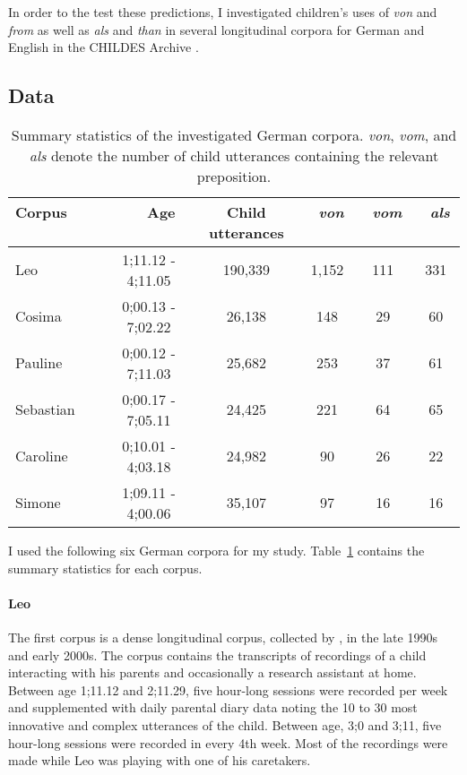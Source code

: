 \documentclass[lucida]{sp} %
\begin{document}
In order to the test these predictions, I investigated children's uses of \textit{von} and \textit{from} as well as \textit{als} and \textit{than} in several longitudinal corpora for German and English in the CHILDES Archive \citep{macwhinney2000}.

\subsection{Data}

\begin{table}
\begin{tabularx}{\textwidth}{l | c | c | c | c | c }
Corpus \ \ \ \ \ \ \ & \ \ \ Age \ \ \ & Child utterances & \  \textit{von}    \ & \   \textit{vom} \ & \  \textit{als} \  \\ \hline
Leo & 1;11.12 - 4;11.05& 190,339 & 1,152 & 111 & 331\\
Cosima & 0;00.13 - 7;02.22 & 26,138 & 148 & 29 & 60 \\
Pauline & 0;00.12 - 7;11.03 & 25,682 & 253 & 37 & 61\\
Sebastian & 0;00.17 - 7;05.11 & 24,425 & 221 & 64 & 65\\
Caroline &0;10.01 - 4;03.18& 24,982 & 90 & 26 & 22 \\
Simone & 1;09.11 - 4;00.06 & 35,107 & 97 & 16 & 16 \\
\end{tabularx}
\caption{Summary statistics of the investigated German corpora. \textit{von}, \textit{vom}, and \textit{als} denote the number of child utterances containing the relevant preposition.}\label{tbl:corpus-stats-de}
\end{table}

I used the following six German corpora for my study. Table~\ref{tbl:corpus-stats-de} contains the summary statistics for each corpus.


\paragraph{Leo}
The first corpus is a  dense longitudinal corpus, collected by \cite{behrens2006}, in the late 1990s and early 2000s. The corpus contains the transcripts of recordings of a child interacting with his parents and occasionally a research assistant at home. Between age 1;11.12 and 2;11.29, five hour-long sessions were recorded per week and supplemented with daily parental diary data noting the 10 to 30 most innovative and complex utterances of the child. Between age, 3;0 and 3;11, five hour-long sessions were recorded in every 4th week. Most of the recordings were made while Leo was playing with one of his caretakers.
\end{document}
